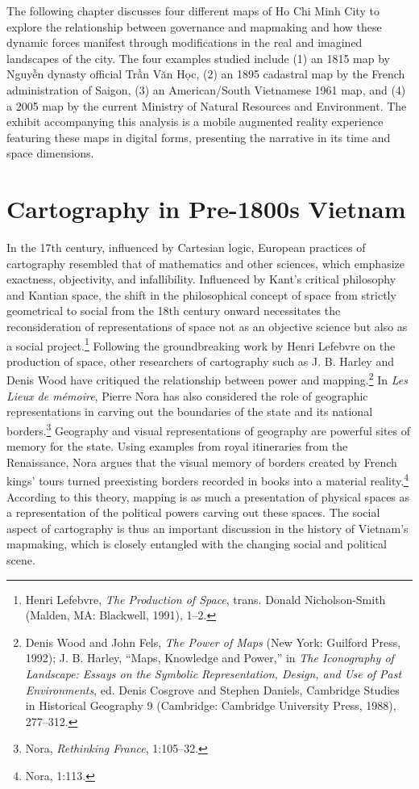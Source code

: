 The following chapter discusses four different maps of Ho Chi Minh City to explore the relationship between governance and mapmaking and how these dynamic forces manifest through modifications in the real and imagined landscapes of the city. The four examples studied include (1) an 1815 map by \vi Nguyễn dynasty official Trần Văn Học, (2) an 1895 cadastral map by the French administration of Saigon, (3) an American/South Vietnamese 1961 map, and (4) a 2005 map by the current Ministry of Natural Resources and Environment. The exhibit accompanying this analysis is a mobile augmented reality experience featuring these maps in digital forms, presenting the narrative in its time and space dimensions. \en

\section{Cartography in Pre-1800s Vietnam}\label{sec:historiography}
In the 17th century, influenced by Cartesian logic, European practices of cartography resembled that of mathematics and other sciences, which emphasize exactness, objectivity, and infallibility. Influenced by Kant's critical philosophy and Kantian space, the shift in the philosophical concept of space from strictly geometrical to social from the 18th century onward necessitates the reconsideration of representations of space not as an objective science but also as a social project.\footnote{Henri Lefebvre, \textit{The Production of Space}, trans. Donald Nicholson-Smith (Malden, MA: Blackwell, 1991), 1–2.}  Following the groundbreaking work by Henri Lefebvre on the production of space, other researchers of cartography such as J. B. Harley and Denis Wood have critiqued the relationship between power and mapping.\footnote{Denis Wood and John Fels, \textit{The Power of Maps} (New York: Guilford Press, 1992); J. B. Harley, “Maps, Knowledge and Power,” in \textit{The Iconography of Landscape: Essays on the Symbolic Representation, Design, and Use of Past Environments}, ed. Denis Cosgrove and Stephen Daniels, Cambridge Studies in Historical Geography 9 (Cambridge: Cambridge University Press, 1988), 277–312.}  In \textit{Les Lieux de mémoire}, Pierre Nora has also considered the role of geographic representations in carving out the boundaries of the state and its national borders.\footnote{Nora, \textit{Rethinking France}, 1:105–32.} Geography and visual representations of geography are powerful sites of memory for the state. Using examples from royal itineraries from the Renaissance, Nora argues that the visual memory of borders created by French kings’ tours turned preexisting borders recorded in books into a material reality.\footnote{Nora, 1:113.} According to this theory, mapping is as much a presentation of physical spaces as a representation of the political powers carving out these spaces. The social aspect of cartography is thus an important discussion in the history of Vietnam’s mapmaking, which is closely entangled with the changing social and political scene.

